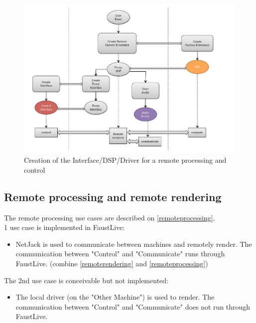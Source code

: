 \documentclass[a4paper]{article}
\begin{document}
\begin{figure}[!h]
\begin{center}
\includegraphics[width=\columnwidth]{images/CCC5}
\caption{Creation of the Interface/DSP/Driver for a remote processing and control}
\label{fig:CCC8}
\end{center}
\end{figure}


\newpage
\subsection{ Remote processing and remote rendering}

The remote processing use cases are described on {\ref {remoteprocessing}}. \\

1 use case is implemented in FaustLive:
\begin{itemize}
\item NetJack is used to communicate between machines and remotely render. The communication between "Control" and "Communicate" runs through FaustLive. (combine \ref{remoterendering} and \ref{remoteprocessing})
\end{itemize}

The 2nd use case is conceivable but not implemented:
\begin{itemize}
\item The local driver (on the "Other Machine") is used to render. The communication between "Control" and "Communicate" does not run through FaustLive.
\end{itemize}
\end{document}

